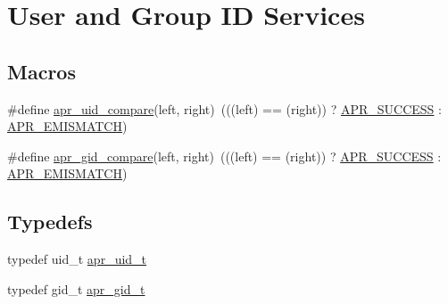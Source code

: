 \hypertarget{group__apr__user}{\section{User and Group I\-D Services}
\label{group__apr__user}
}
\subsection*{Macros}
\begin{DoxyCompactItemize}
\item 
\#define \hyperlink{group__apr__user_gafc0e18b67f8e3471848893cc4a052809}{apr\-\_\-uid\-\_\-compare}(left, right)~(((left) == (right)) ? \hyperlink{group__apr__errno_ga9ee311b7bf1c691dc521d721339ee2a6}{A\-P\-R\-\_\-\-S\-U\-C\-C\-E\-S\-S} \-: \hyperlink{group___a_p_r___error_ga31e65a44daba96aa6d943529e94498e7}{A\-P\-R\-\_\-\-E\-M\-I\-S\-M\-A\-T\-C\-H})
\item 
\#define \hyperlink{group__apr__user_gaa87aee2f533bed9dac33613fcf398713}{apr\-\_\-gid\-\_\-compare}(left, right)~(((left) == (right)) ? \hyperlink{group__apr__errno_ga9ee311b7bf1c691dc521d721339ee2a6}{A\-P\-R\-\_\-\-S\-U\-C\-C\-E\-S\-S} \-: \hyperlink{group___a_p_r___error_ga31e65a44daba96aa6d943529e94498e7}{A\-P\-R\-\_\-\-E\-M\-I\-S\-M\-A\-T\-C\-H})
\end{DoxyCompactItemize}
\subsection*{Typedefs}
\begin{DoxyCompactItemize}
\item 
typedef uid\-\_\-t \hyperlink{group__apr__user_gad1aa508f584bc230acf4f68ba4fc4de7}{apr\-\_\-uid\-\_\-t}
\item 
typedef gid\-\_\-t \hyperlink{group__apr__user_ga22e9e224e984f837f3e276833e2f3a55}{apr\-\_\-gid\-\_\-t}
\end{DoxyCompactItemize}
